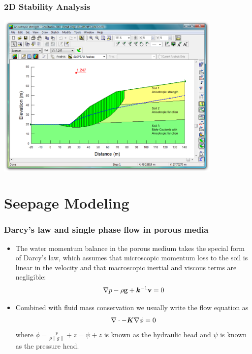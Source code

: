 \documentclass{beamer}
\begin{document}
\begin{frame}
\frametitle{2D Stability Analysis}
\includegraphics[width=4.35in]{screen-slope-full.png}
\end{frame}  

\section{Seepage Modeling}

\begin{frame}
  \frametitle{Darcy's law and single phase flow in porous media}
  \begin{itemize}
    \item The water momentum balance in the porous medium takes the
      special form of Darcy's law, which assumes that microscopic
      momentum loss to the soil is linear in the velocity and that
      macroscopic inertial and viscous terms are negligible:
    \begin{equation}
      \nabla p - \rho {\bf g}  + \mbox{{\boldmath ${k}$}}^{-1} {\bf v} = 0
    \end{equation}
    \item Combined with fluid mass conservation we usually write the flow equation as
      \begin{equation}
        \nabla \cdot  -\mbox{{\boldmath ${K}$}} \nabla \phi = 0 
      \end{equation}
      where $\phi = \frac{p}{\rho\|g\|} + z = \psi + z$ is known as the hydraulic head and $\psi$ is known as the pressure head.

  \end{itemize}
\end{frame}
\end{document}

